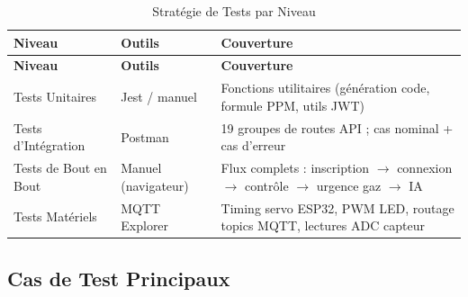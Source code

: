\begin{center}
\begin{longtable}{p{} p{} p{}}
\caption{Stratégie de Tests par Niveau}\label{tab:test_levels}\\
\toprule
\textbf{Niveau} & \textbf{Outils} & \textbf{Couverture} \\
\midrule
\endfirsthead
\toprule
\textbf{Niveau} & \textbf{Outils} & \textbf{Couverture} \\
\midrule
\endhead
\bottomrule
\endfoot
Tests Unitaires    & Jest / manuel    & Fonctions utilitaires (génération code, formule PPM, utils JWT) \\
Tests d'Intégration & Postman         & 19 groupes de routes API ; cas nominal + cas d'erreur \\
Tests de Bout en Bout & Manuel (navigateur) & Flux complets : inscription $\to$ connexion $\to$ contrôle $\to$ urgence gaz $\to$ IA \\
Tests Matériels    & MQTT Explorer    & Timing servo ESP32, PWM LED, routage topics MQTT, lectures ADC capteur \\
\end{longtable}
\end{center}

\subsection{Cas de Test Principaux}

